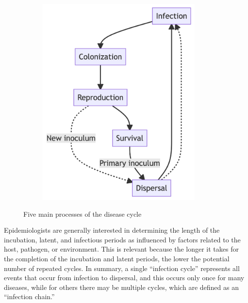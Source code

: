 \documentclass[
  letterpaper,
  DIV=11,
  numbers=noendperiod]{scrreprt}
\begin{document}
\begin{figure}

{\centering 

\begin{figure}[H]

{\centering \includegraphics[width=3.26in,height=4.22in]{temporal-dpc_files/figure-latex/mermaid-figure-1.png}

}

\end{figure}

}

\caption{\label{fig-diagram}Five main processes of the disease cycle}

\end{figure}

Epidemiologists are generally interested in determining the length of
the incubation, latent, and infectious periods as influenced by factors
related to the host, pathogen, or environment. This is relevant because
the longer it takes for the completion of the incubation and latent
periods, the lower the potential number of repeated cycles. In summary,
a single ``infection cycle'' represents all events that occur from
infection to dispersal, and this occurs only once for many diseases,
while for others there may be multiple cycles, which are defined as an
``infection chain.''
\end{document}
